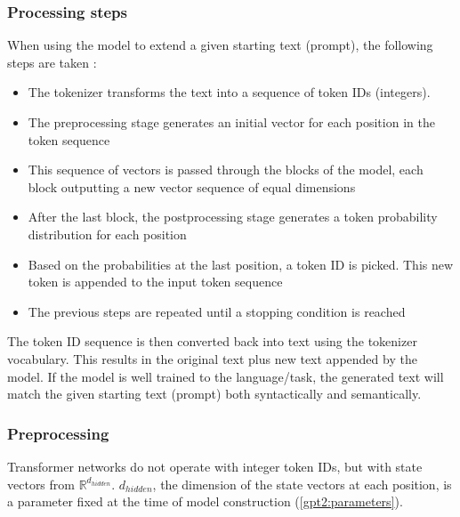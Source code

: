 \subsubsection{Processing steps}

When using the model to extend a given starting text (prompt), the following steps are taken \cite{alammar-gpt2} :

\begin{itemize}
\item The tokenizer transforms the text into a sequence of token IDs (integers).
\item The preprocessing stage generates an initial vector for each position in the token sequence
\item This sequence of vectors is passed through the blocks of the model, each block outputting a new vector sequence of equal dimensions
\item After the last block, the postprocessing stage generates a token probability distribution for each position
\item Based on the probabilities at the last position, a token ID is picked. This new token is appended to the input token sequence
\item The previous steps are repeated until a stopping condition is reached
\end{itemize}

The token ID sequence is then converted back into text using the tokenizer vocabulary. This results in the original text plus new text appended by the model. If the model is well trained to the language/task, the generated text will match the given starting text (prompt) both syntactically and semantically.

\subsubsection{Preprocessing}
\label{gpt2_preproc}


Transformer networks do not operate with integer token IDs, but with state vectors from $\mathbb{R}^{d_{hidden}}$. $d_{hidden}$, the dimension of the state vectors at each position, is a parameter fixed at the time of model construction (\ref{gpt2:parameters}).


